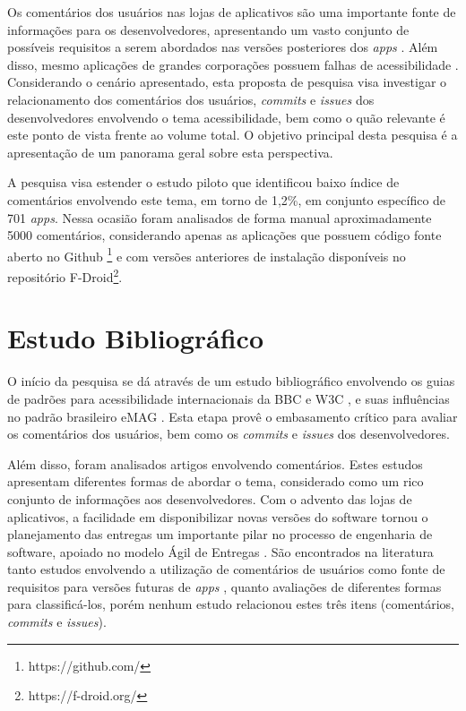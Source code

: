 
Os comentários dos usuários nas lojas de aplicativos são uma importante fonte de informações para os desenvolvedores, apresentando um vasto conjunto de possíveis requisitos a serem abordados nas versões posteriores dos \textit{apps} \cite{Ciurumelea2017analyzing,Li2018MobileAE,Ortega2015thesis,Palomba2015userreviews,Palompa2018crowdsourcing,Pelloni2018becloma}. Além disso, mesmo aplicações de grandes corporações possuem falhas de acessibilidade \cite{Eler2018mate}. Considerando o cenário apresentado, esta proposta de pesquisa visa investigar o relacionamento dos comentários dos usuários, \textit{commits} e \textit{issues} dos desenvolvedores envolvendo o tema acessibilidade, bem como o quão relevante é este ponto de vista frente ao volume total. O objetivo principal desta pesquisa é a apresentação de um panorama geral sobre esta perspectiva.

A pesquisa visa estender o estudo piloto \cite{ihc2019} que identificou baixo índice de comentários envolvendo este tema, em torno de 1,2\%, em conjunto específico de 701 \textit{apps}. Nessa ocasião foram analisados de forma manual aproximadamente 5000 comentários, considerando apenas as aplicações que possuem código fonte aberto no Github \footnote{https://github.com/} e com versões anteriores de instalação disponíveis no repositório F-Droid\footnote{https://f-droid.org/}.


\section{Estudo Bibliográfico}
O início da pesquisa se dá através de um estudo bibliográfico envolvendo os guias de padrões para acessibilidade internacionais da BBC \cite{bbc} e W3C \cite{wcag}, e suas influências no padrão brasileiro eMAG \cite{emag}. Esta etapa provê o embasamento crítico para avaliar os comentários dos usuários, bem como os \textit{commits} e \textit{issues} dos desenvolvedores.

Além disso, foram analisados artigos envolvendo comentários. Estes estudos apresentam diferentes formas de abordar o tema, considerado como um rico conjunto de informações aos desenvolvedores. Com o advento das lojas de aplicativos, a facilidade em disponibilizar novas versões do software tornou o planejamento das entregas um importante pilar no processo de engenharia de software, apoiado no modelo Ágil de Entregas \cite{manifestoagil}. São encontrados na literatura tanto estudos envolvendo a utilização de comentários de usuários como fonte de requisitos para versões futuras de \textit{apps} \cite{Ciurumelea2017analyzing,Li2018MobileAE,Ortega2015thesis,Palomba2015userreviews}, quanto avaliações de diferentes formas para classificá-los\cite{Panichella2015how,Pelloni2018becloma,Sorbo2017surf}, porém nenhum estudo relacionou estes três itens (comentários, \textit{commits} e \textit{issues}).


